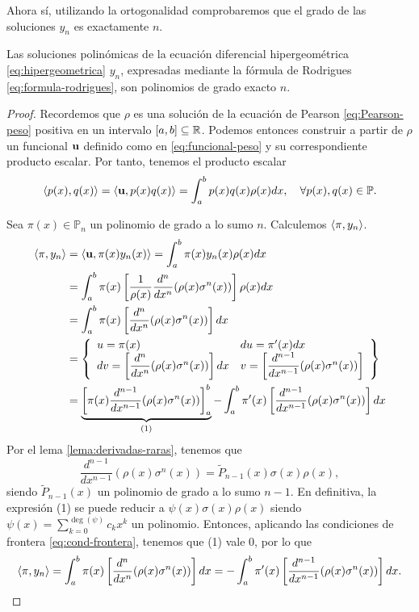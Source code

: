 Ahora sí, utilizando la ortogonalidad comprobaremos que el grado de las soluciones $y_n$ es exactamente $n$.

\begin{proposicion}
    \label{prop:grado-rodrigues}
    Las soluciones polinómicas de la ecuación diferencial hipergeométrica \eqref{eq:hipergeometrica} $y_n$, expresadas mediante la fórmula de Rodrigues \eqref{eq:formula-rodrigues}, son polinomios de grado exacto $n$.
\end{proposicion}
\begin{proof}
    Recordemos que $\rho$ es una solución de la ecuación de Pearson \eqref{eq:Pearson-peso} positiva en un intervalo $[a,b]\subseteq \mathbb{R}$. Podemos entonces construir a partir de $\rho$ un funcional $\mathbf{u}$ definido como en \eqref{eq:funcional-peso} y su correspondiente producto escalar. Por tanto, tenemos el producto escalar
    $$
    \left\langle p(x) , q(x) \right\rangle = \left\langle \mathbf{u} , p(x)q(x) \right\rangle = \int_a^b p(x)q(x)\rho(x)dx, \ \ \ \forall p(x),q(x)\in\mathbb{P}. 
    $$

    Sea $\pi(x)\in\mathbb{P}_n$ un polinomio de grado a lo sumo $n$. Calculemos $\left\langle \pi , y_n \right\rangle$.
    \begin{equation*}
        \begin{split}
            \left\langle \pi , y_n \right\rangle &= \left\langle \mathbf{u} , \pi(x)y_n(x) \right\rangle = \int_a^b \pi(x)y_n(x)\rho(x)dx \\
            &= \int_a^b \pi(x)\left[\dfrac 1 {\rho(x)} \dfrac{d^n}{dx^n} (\rho(x) \sigma^n(x))\right]\rho(x)dx \\
            &= \int_a^b \pi(x)\left[\dfrac{d^n}{dx^n} (\rho(x) \sigma^n(x))\right]dx \\
            &= \left\{\begin{array}{ll}
                u=\pi(x) & du = \pi'(x)dx\\
                dv =  \left[\dfrac{d^n}{dx^n} (\rho(x) \sigma^n(x))\right]dx  & v=\left[\dfrac{d^{n-1}}{dx^{n-1}} (\rho(x) \sigma^n(x))\right]
             \end{array}\right\} \\
            &= \underbrace{\left[\pi(x)\dfrac{d^{n-1}}{dx^{n-1}} (\rho(x) \sigma^n(x))\right]_a^b}_{(1)} - \int_a^b \pi'(x)\left[\dfrac{d^{n-1}}{dx^{n-1}} (\rho(x) \sigma^n(x))\right]dx \\
        \end{split}
    \end{equation*}
    Por el lema \ref{lema:derivadas-raras}, tenemos que
    $$
    \dfrac{d^{n-1}}{dx^{n-1}}(\rho(x)\sigma^n(x)) = \tilde P_{n-1}(x) \sigma(x)\rho(x),
    $$
    siendo $\tilde P_{n-1}(x)$ un polinomio de grado a lo sumo $n-1$. En definitiva, la expresión (1) se puede reducir a $\psi(x)\sigma(x)\rho(x)$ siendo $\psi(x)=\displaystyle\sum_{k=0}^{\deg(\psi)}c_k x^k$ un polinomio. Entonces, aplicando las condiciones de frontera \eqref{eq:cond-frontera}, tenemos que (1) vale $0$, por lo que
    $$
    \left\langle \pi , y_n \right\rangle = \int_a^b \pi(x)\left[\dfrac{d^n}{dx^n} (\rho(x) \sigma^n(x))\right]dx = - \int_a^b \pi'(x)\left[\dfrac{d^{n-1}}{dx^{n-1}} (\rho(x) \sigma^n(x))\right]dx.
    $$


\end{proof}

